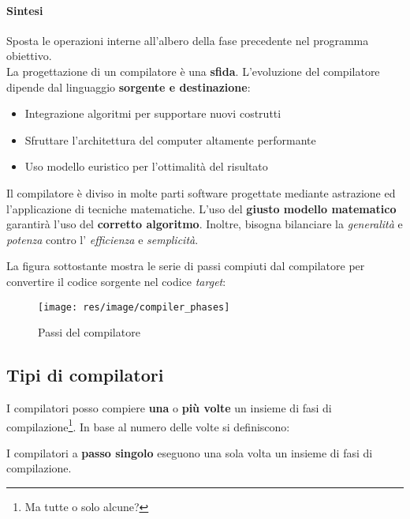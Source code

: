 \paragraph{Sintesi}
Sposta le operazioni interne all'albero della fase precedente nel programma
obiettivo. \\

La progettazione di un compilatore è una \textbf{sfida}. L'evoluzione del
compilatore dipende dal linguaggio \textbf{sorgente e destinazione}:
\begin{itemize}
\item Integrazione algoritmi per supportare nuovi costrutti
\item Sfruttare l'architettura del computer altamente performante
\item Uso modello euristico per l'ottimalità del risultato
\end{itemize}

Il compilatore è diviso in molte parti software progettate mediante astrazione
ed l'applicazione di tecniche matematiche. L'uso del \textbf{giusto modello
matematico} garantirà l'uso del \textbf{corretto algoritmo}. Inoltre, bisogna
bilanciare la \textit{generalità} e \textit{potenza} contro l'
\textit{efficienza} e \textit{semplicità}.

La figura sottostante mostra le serie di passi compiuti dal compilatore per
convertire il codice sorgente nel codice \textit{target}:

\begin{figure}[H]
\begin{center}
\texttt{[image: res/image/compiler\_phases]}
\caption{Passi del compilatore}
\label{fig:compiler_phases}
\end{center}
\end{figure}

\subsection{Tipi di compilatori}
\label{sec:tipi_compilatori}
I compilatori posso compiere \textbf{una} o \textbf{più volte} un insieme di
fasi di compilazione\footnote{Ma tutte o solo alcune?}. In base al numero delle
volte si definiscono:

\begin{definition}
I compilatori a \textbf{passo singolo} eseguono una sola volta un insieme di
fasi di compilazione.
\end{definition}

